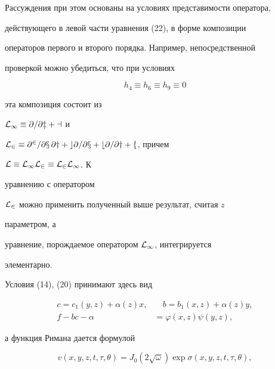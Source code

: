 Рассуждения при этом основаны на условиях представимости оператора,


действующего в левой части уравнения (22), в форме композиции


операторов первого и второго порядка. Например, непосредственной


проверкой можно убедиться, что при условиях


\begin{equation}


h_4\equiv h_6\equiv h_9\equiv 0


\end{equation}


эта композиция состоит из


$\cal L_1\equiv\partial/\partial z+a$ и


$\cal L_2\equiv\partial^2/\partial x\,\partial y+


c\partial/\partial x+b\partial/\partial y+f$, причем


$\cal L\equiv \cal L_1\cal L_2\equiv\cal L_2\cal L_1$. К


уравнению с оператором


$\cal L_2$ можно применить полученный выше результат, считая $z$


параметром, а


уравнение, порождаемое оператором $\cal L_1$, интегрируется


элементарно.


Условия (14), (20) принимают здесь вид


\begin{equation}


\begin{split}


c=c_1(y,z)+\alpha(z)x, &\quad b=b_1(x,z)+\alpha(z)y,\\


f-bc-\alpha&=\varphi(x,z)\psi(y,z),


\end{split}


\end{equation}


а функция Римана дается формулой


\begin{equation}


v(x,y,z,t,\tau,\theta)=J_0(2\sqrt\omega)\exp\sigma


(x,y,z,t,\tau,\theta),


\end{equation}



